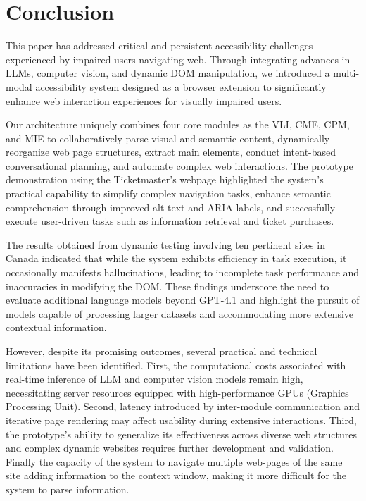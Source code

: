 \documentclass[conference]{IEEEtran}
\begin{document}
\section{Conclusion}\label{conclusion}

This paper has addressed critical and persistent accessibility challenges experienced by impaired users navigating web. Through integrating advances in LLMs, computer vision, and dynamic DOM manipulation, we introduced a multi-modal accessibility system designed as a browser extension to significantly enhance web interaction experiences for visually impaired users.

Our architecture uniquely combines four core modules as the VLI, CME, CPM, and MIE to collaboratively parse visual and semantic content, dynamically reorganize web page structures, extract main elements, conduct intent-based conversational planning, and automate complex web interactions. The prototype demonstration using the Ticketmaster's webpage highlighted the system's practical capability to simplify complex navigation tasks, enhance semantic comprehension through improved alt text and ARIA labels, and successfully execute user-driven tasks such as information retrieval and ticket purchases.

The results obtained from dynamic testing involving ten pertinent sites in Canada indicated that while the system exhibits efficiency in task execution, it occasionally manifests hallucinations, leading to incomplete task performance and inaccuracies in modifying the DOM. These findings underscore the need to evaluate additional language models beyond GPT-4.1 and highlight the pursuit of models capable of processing larger datasets and accommodating more extensive contextual information.

However, despite its promising outcomes, several practical and technical limitations have been identified. First, the computational costs associated with real-time inference of LLM and computer vision models remain high, necessitating server resources equipped with high-performance GPUs (Graphics Processing Unit). Second, latency introduced by inter-module communication and iterative page rendering may affect usability during extensive interactions. Third, the prototype's ability to generalize its effectiveness across diverse web structures and complex dynamic websites requires further development and validation. Finally the capacity of the system to navigate multiple web-pages of the same site adding information to the context window, making it more difficult for the system to parse information. 
\end{document}
